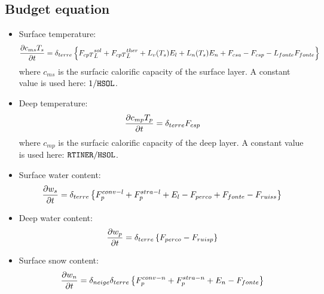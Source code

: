 \subsection*{Budget equation}
\begin{itemize}
      \item Surface temperature:
            $$ \frac{\displaystyle \partial c_{ms} T_s}{\displaystyle \partial t}=  
               \delta_{terre}\left\{{F_{cp T}}_{\tilde{L}}^{sol}+{F_{cp T}}_{\tilde{L}}^{ther} 
               +L_v(T_s)E_l+L_n(T_s)E_n+F_{csa}-F_{csp}-L_{fonte} F_{fonte}\right\}
            $$
            where $c_{ms}$ is the surfacic calorific capacity of the surface layer. A constant value is used here: $1/\mbox{\tt HSOL}$.
      \item Deep temperature:
            $$ \frac{\displaystyle \partial c_{mp} T_p}{\displaystyle \partial t}= \delta_{terre}F_{csp} $$
            where $c_{mp}$ is the surfacic calorific capacity of the deep layer. A constant value is used here: $\mbox{\tt RTINER}/\mbox{\tt HSOL}$.
      \item Surface water content:
            $$ \frac{\displaystyle \partial w_s}{\displaystyle \partial t}=\delta_{terre}\left\{ F_{p}^{conv-l}+F_{p}^{stra-l}+E_l-F_{perco}+F_{fonte}-F_{ruiss}\right\}$$
      \item Deep water content:
            $$ \frac{\displaystyle \partial w_p}{\displaystyle \partial t}=\delta_{terre}\left\{ F_{perco}-F_{ruisp}\right\}$$
      \item Surface snow content:
            $$ \frac{\displaystyle \partial w_n}{\displaystyle \partial t}=\delta_{neige}\delta_{terre}\left\{ F_{p}^{conv-n}+F_{p}^{stra-n}+E_n-F_{fonte}\right\}$$
\end{itemize}
